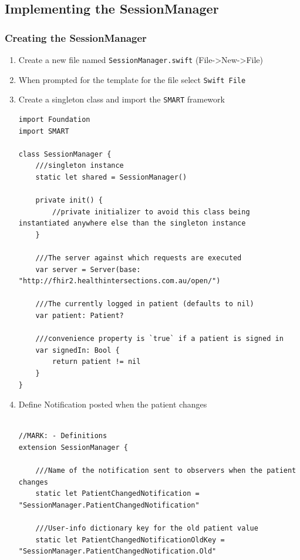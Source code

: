 \documentclass{article}
\begin{document}
\subsection{Implementing the
SessionManager}\label{implementing-the-sessionmanager}

\subsubsection{Creating the SessionManager}
\begin{enumerate}
\def\labelenumi{\arabic{enumi}.}
\item
  Create a new file named \texttt{SessionManager.swift}
  (File-\textgreater{}New-\textgreater{}File)
\item
  When prompted for the template for the file select
  \texttt{Swift\ File}
\item
  Create a singleton class and import the \texttt{SMART} framework

\begin{verbatim}
import Foundation
import SMART

class SessionManager {
    ///singleton instance
    static let shared = SessionManager()

    private init() {
        //private initializer to avoid this class being instantiated anywhere else than the singleton instance
    }

    ///The server against which requests are executed
    var server = Server(base: "http://fhir2.healthintersections.com.au/open/")

    ///The currently logged in patient (defaults to nil)
    var patient: Patient?

    ///convenience property is `true` if a patient is signed in
    var signedIn: Bool {
        return patient != nil
    }
}
\end{verbatim}

\item
Define Notification posted when the patient changes

\begin{verbatim}

//MARK: - Definitions
extension SessionManager {

    ///Name of the notification sent to observers when the patient changes
    static let PatientChangedNotification = "SessionManager.PatientChangedNotification"

    ///User-info dictionary key for the old patient value
    static let PatientChangedNotificationOldKey = "SessionManager.PatientChangedNotification.Old"


\end{verbatim}
\end{enumerate}
\end{document}
